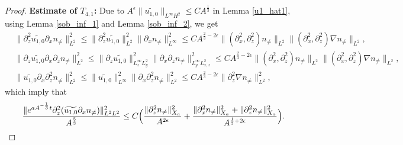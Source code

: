 \documentclass[12pt, reqno]{amsart}
\numberwithin{equation}{section}
\begin{document}
\begin{proof}
		\noindent\textbf{Estimate of $T_{4,1}$:}
		Due to $A^{\epsilon}\|\widetilde{u_{1,0}}\|_{L^{\infty}H^2}\leq CA^{\frac13}$ in Lemma \ref{u1_hat1},  using Lemma \ref{sob_inf_1} and Lemma \ref{sob_inf_2}, we get 
		\begin{equation*}
			\begin{aligned}
				&\|\partial_z^2\widetilde{u_{1,0}}\partial_x n_{\neq}\|_{L^2}^2\leq
				\|\partial_z^2\widetilde{u_{1,0}}\|_{L^2}^2
				\|\partial_x n_{\neq}\|_{L^{\infty}}^2
				\leq CA^{\frac23-2\epsilon}
				\|(\partial_x^2,\partial_z^2) n_{\neq}\|_{L^2}
				\|(\partial_x^2,\partial_z^2)\nabla n_{\neq}\|_{L^2},\\
				&\|\partial_z\widetilde{u_{1,0}}\partial_x\partial_z n_{\neq}\|_{L^2}^2\leq
				\|\partial_z\widetilde{u_{1,0}}\|_{L^{\infty}_zL^2_y}^2
				\|\partial_x\partial_z n_{\neq}\|_{L^{\infty}_yL^2_{x,z}}^2
				\leq CA^{\frac23-2\epsilon}
				\|(\partial_x^2,\partial_z^2) n_{\neq}\|_{L^2}
				\|(\partial_x^2,\partial_z^2)\nabla n_{\neq}\|_{L^2},\\	
				&\|\widetilde{u_{1,0}}\partial_x\partial_z^2 n_{\neq}\|_{L^2}^2
				\leq\|\widetilde{u_{1,0}}\|_{L^{\infty}}^2
				\|\partial_x\partial_z^2 n_{\neq}\|_{L^2}^2
				\leq CA^{\frac23-2\epsilon}
				\|\partial_z^2\nabla n_{\neq}\|^2_{L^2},	
			\end{aligned}
		\end{equation*}
		which imply that 
		\begin{equation}\label{temp1_1}
			\begin{aligned}
				\frac{\|{\rm e}^{aA^{-\frac{1}{3}}t}
					\partial_z^2(\widetilde{u_{1,0}}\partial_x n_{\neq})\|_{L^2L^2}^2}{A^{\frac{5}{3}}}
				\leq C\Big(\frac{\|\partial_z^2 n_{\neq}\|^2_{X_a}}{A^{2\epsilon}}
				+\frac{\|\partial_x^2 n_{\neq}\|^2_{X_a}
					+\|\partial_z^2 n_{\neq}\|^2_{X_a}}{A^{\frac13+2\epsilon}}\Big).
			\end{aligned}
		\end{equation}
		

\end{proof}
\end{document}
